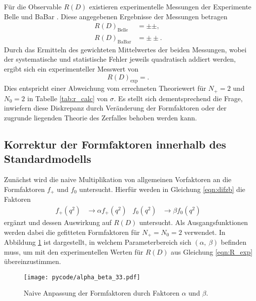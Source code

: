 Für die Observable $R(D)$ existieren experimentelle Messungen der Experimente Belle \cite{PhysRevD.92.072014} und BaBar \cite{PhysRevLett.109.101802}.
Diese angegebenen Ergebnisse der Messungen betragen
\begin{align*}
  R(D)_\text{Belle} &=  \pm  \pm  ,\\
  R(D)_\text{BaBar} &=  \pm  \pm .
\end{align*}
Durch das Ermitteln des gewichteten Mittelwertes der beiden Messungen, wobei der systematische und statistische Fehler jeweils quadratisch addiert werden, ergibt sich ein experimenteller Messwert von
\begin{equation}
  \label{eqn:R_exp}
  R(D)_\text{exp} = .
\end{equation}
Dies entspricht einer Abweichung vom errechneten Theoriewert für $N_+=\num{2}$ und $N_0=\num{2}$ in Tabelle \ref{tab:r_calc} von $\sigma$.
Es stellt sich dementsprechend die Frage, inwiefern diese Diskrepanz durch Veränderung der Formfaktoren oder der zugrunde liegenden Theorie des Zerfalles behoben werden kann.

\subsection{Korrektur der Formfaktoren innerhalb des Standardmodells}
\label{sec:naiv}
Zunächst wird die naive Multiplikation von allgemeinen Vorfaktoren an die Formfaktoren $f_+$ und $f_0$ untersucht.
Hierfür werden in Gleichung \eqref{eqn:difzb} die Faktoren
\begin{align*}
  f_+(q^2) &\to \alpha f_+(q^2) & f_0(q^2) &\to \beta f_0(q^2)
\end{align*}
ergänzt und dessen Auswirkung auf $R(D)$ untersucht.
Als Ausgangsfunktionen werden dabei die gefitteten Formfaktoren für $N_+ = N_0 = \num{2}$ verwendet.
In Abbildung \ref{fig:alpha_beta} ist dargestellt, in welchem Parameterbereich sich $(\alpha, \: \beta)$ befinden muss, um mit den experimentellen Werten für $R(D)$ aus Gleichung \eqref{eqn:R_exp} übereinzustimmen.
\begin{figure}
  \centering
  \texttt{[image: pycode/alpha\_beta\_33.pdf]}
  \caption{Naive Anpassung der Formfaktoren durch Faktoren $\alpha$ und $\beta$.}
  \label{fig:alpha_beta}
\end{figure}

